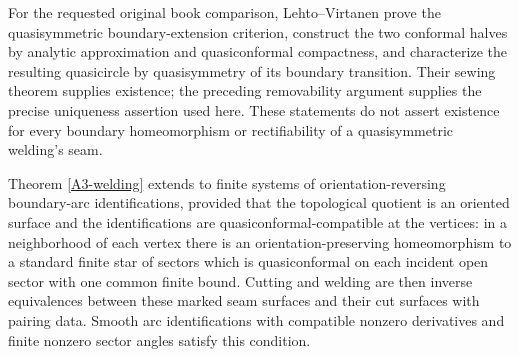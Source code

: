 For the requested original book comparison, Lehto--Virtanen
\cite[Chapter II, Theorems 6.2--6.3, pp.~81 and 83--85; Section 7.5,
pp.~92--95; Theorem 8.5, p.~100]{ALehtoVirtanen1973} prove the
quasisymmetric boundary-extension criterion, construct the two
conformal halves by analytic approximation and quasiconformal
compactness, and characterize the resulting quasicircle by
quasisymmetry of its boundary transition. Their sewing theorem
supplies existence; the preceding removability argument supplies
the precise uniqueness assertion used here. These statements do
not assert existence for every boundary homeomorphism or
rectifiability of a quasisymmetric welding's seam.

\begin{proposition}\label{A3-graph}
Theorem \ref{A3-welding} extends to finite systems of orientation-reversing boundary-arc identifications, provided that the topological quotient is an oriented surface and the identifications are quasiconformal-compatible at the vertices: in a neighborhood of each vertex there is an orientation-preserving homeomorphism to a standard finite star of sectors which is quasiconformal on each incident open sector with one common finite bound. Cutting and welding are then inverse equivalences between these marked seam surfaces and their cut surfaces with pairing data. Smooth arc identifications with compatible nonzero derivatives and finite nonzero sector angles satisfy this condition.
\end{proposition}
